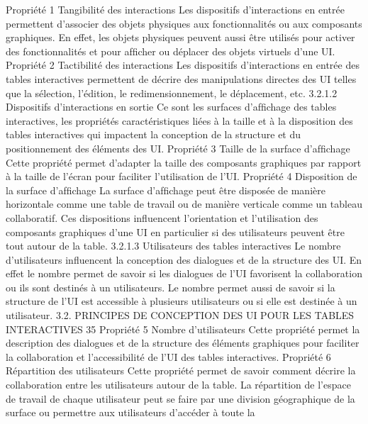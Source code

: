 \documentclass{article}
\begin{document}
Propri\'{e}t\'{e} 1 Tangibilit\'{e} des interactions
Les dispositifs d’interactions en entr\'{e}e permettent d’associer des objets physiques aux fonctionnalit\'{e}s ou aux composants graphiques. En effet, les objets physiques peuvent aussi \^{e}tre
utilis\'{e}s pour activer des fonctionnalit\'{e}s et pour afﬁcher ou d\'{e}placer des objets virtuels d’une
UI.
Propri\'{e}t\'{e} 2 Tactibilit\'{e} des interactions
Les dispositifs d’interactions en entr\'{e}e des tables interactives permettent de d\'{e}crire des
manipulations directes des UI telles que la s\'{e}lection, l’\'{e}dition, le redimensionnement, le
d\'{e}placement, etc.
3.2.1.2
Dispositifs d’interactions en sortie
Ce sont les surfaces d’afﬁchage des tables interactives, les propri\'{e}t\'{e}s caract\'{e}ristiques li\'{e}es \`{a} la
taille et \`{a} la disposition des tables interactives qui impactent la conception de la structure et du positionnement des \'{e}l\'{e}ments des UI.
Propri\'{e}t\'{e} 3 Taille de la surface d’afﬁchage
Cette propri\'{e}t\'{e} permet d’adapter la taille des composants graphiques par rapport \`{a} la taille
de l’\'{e}cran pour faciliter l’utilisation de l’UI.
Propri\'{e}t\'{e} 4 Disposition de la surface d’afﬁchage
La surface d’afﬁchage peut \^{e}tre dispos\'{e}e de mani\`{e}re horizontale comme une table de travail
ou de mani\`{e}re verticale comme un tableau collaboratif. Ces dispositions inﬂuencent l’orientation et l’utilisation des composants graphiques d’une UI en particulier si des utilisateurs
peuvent \^{e}tre tout autour de la table.
3.2.1.3
Utilisateurs des tables interactives
Le nombre d’utilisateurs inﬂuencent la conception des dialogues et de la structure des UI. En effet
le nombre permet de savoir si les dialogues de l’UI favorisent la collaboration ou ils sont destin\'{e}s
\`{a} un utilisateurs. Le nombre permet aussi de savoir si la structure de l’UI est accessible \`{a} plusieurs
utilisateurs ou si elle est destin\'{e}e \`{a} un utilisateur.
3.2. PRINCIPES DE CONCEPTION DES UI POUR LES TABLES INTERACTIVES
35
Propri\'{e}t\'{e} 5 Nombre d’utilisateurs
Cette propri\'{e}t\'{e} permet la description des dialogues et de la structure des \'{e}l\'{e}ments graphiques pour faciliter la collaboration et l’accessibilit\'{e} de l’UI des tables interactives.
Propri\'{e}t\'{e} 6 R\'{e}partition des utilisateurs
Cette propri\'{e}t\'{e} permet de savoir comment d\'{e}crire la collaboration entre les utilisateurs autour de la table. La r\'{e}partition de l’espace de travail de chaque utilisateur peut se faire par
une division g\'{e}ographique de la surface ou permettre aux utilisateurs d’acc\'{e}der \`{a} toute la
\end{document}
